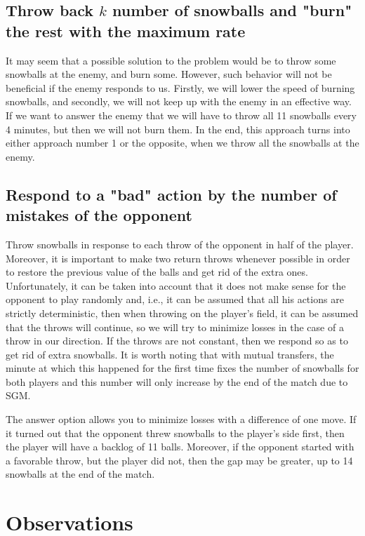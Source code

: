 \documentclass[conference]{IEEEtran}
\begin{document}
\subsection{Throw back $k$ number of snowballs and "burn" the rest with the maximum rate}
It may seem that a possible solution to the problem would be to throw some snowballs at the enemy, and burn some. However, such behavior will not be beneficial if the enemy responds to us. Firstly, we will lower the speed of burning snowballs, and secondly, we will not keep up with the enemy in an effective way. If we want to answer the enemy that we will have to throw all 11 snowballs every 4 minutes, but then we will not burn them. In the end, this approach turns into either approach number 1 or the opposite, when we throw all the snowballs at the enemy.

\subsection{Respond to a "bad" action by the number of mistakes of the opponent}
Throw snowballs in response to each throw of the opponent in half of the player. Moreover, it is important to make two return throws whenever possible in order to restore the previous value of the balls and get rid of the extra ones. Unfortunately, it can be taken into account that it does not make sense for the opponent to play randomly and, i.e., it can be assumed that all his actions are strictly deterministic, then when throwing on the player's field, it can be assumed that the throws will continue, so we will try to minimize losses in the case of a throw in our direction. If the throws are not constant, then we respond so as to get rid of extra snowballs. It is worth noting that with mutual transfers, the minute at which this happened for the first time fixes the number of snowballs for both players and this number will only increase by the end of the match due to SGM.

The answer option allows you to minimize losses with a difference of one move. If it turned out that the opponent threw snowballs to the player's side first, then the player will have a backlog of 11 balls. Moreover, if the opponent started with a favorable throw, but the player did not, then the gap may be greater, up to 14 snowballs at the end of the match. 

\section{Observations}
\end{document}
